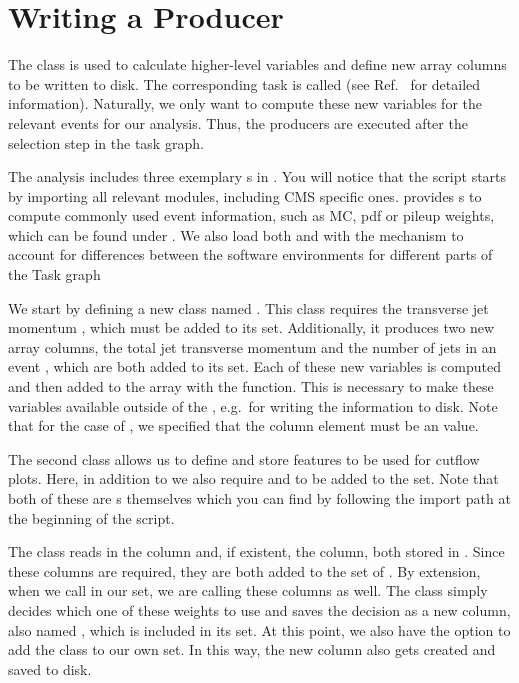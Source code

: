 \section{Writing a Producer}\label{sec:producer}

The  class is used to calculate higher-level variables and define new array columns to be written to disk.
The corresponding task is called  (see Ref.~\cite{cf_repo} for detailed information).
Naturally, we only want to compute these new variables for the relevant events for our analysis.
Thus, the producers are executed after the selection step in the task graph. 

The  analysis includes three exemplary s in .
You will notice that the script starts by importing all relevant modules, including CMS specific ones.
\columnflow provides s to compute commonly used event information, such as MC, pdf or pileup weights, which can be found under .
We also load both  and  with the  mechanism to account for differences between the software environments for different parts of the Task graph

We start by defining a new  class named .
This class requires the transverse jet momentum , which must be added to its  set.
Additionally, it produces two new array columns, the total jet transverse momentum  and the number of jets in an event , which are both added to its  set.
Each of these new variables is computed and then added to the  array with the  function.
This is necessary to make these variables available outside of the , e.g.\ for writing the information to disk.
Note that for the case of , we specified that the column element must be an  value.

The second  class  allows us to define and store features to be used for cutflow plots. Here, in addition to  we also require  and  to be added to the  set. Note that both of these are s themselves which you can find by following the import path at the beginning of the script. 

The   class  reads in the  column and, if existent, the  column, both stored in . Since these columns are required, they are both added to the  set of . By extension, when we call  in our  set, we are calling these columns as well. The  class simply decides which one of these weights to use and saves the decision as a new column, also named , which is included in its  set. At this point, we also have the option to add the  class to our own  set. In this way, the new column also gets created and saved to disk.

